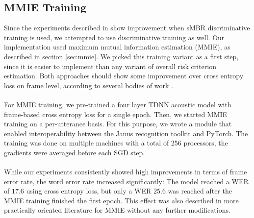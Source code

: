 \subsection{MMIE Training}
Since the experiments described in \cite{peddinti2015jhu} show improvement when sMBR discriminative training is used, we attempted to use discriminative training as well. Our implementation used maximum mutual information estimation (MMIE), as described in section \ref{sec:mmie}. We picked this training variant as a first step, since it is easier to implement than any variant of overall risk criterion estimation. Both approaches should show some improvement over cross entropy loss on frame level, according to several bodies of work \cite{povey2005discriminative} \cite{ghoshal2013sequence}. \\ \\
For MMIE training, we pre-trained a four layer TDNN acoustic model with frame-based cross entropy loss for a single epoch. Then, we started MMIE training on a per-utterance basis. For this purpose, we wrote a module that enabled interoperability between the Janus recognition toolkit and PyTorch. The training was done on multiple machines with a total of 256 processors, the gradients were averaged before each SGD step. \\ \\
While our experiments consistently showed high improvements in terms of frame error rate, the word error rate increased significantly: The model reached a WER of $17.6$ using cross entropy loss, but only a WER $25.6$ was reached after the MMIE training finished the first epoch. This effect was also described in more practically oriented literature \cite{su2013error} for MMIE without any further modifications. 


